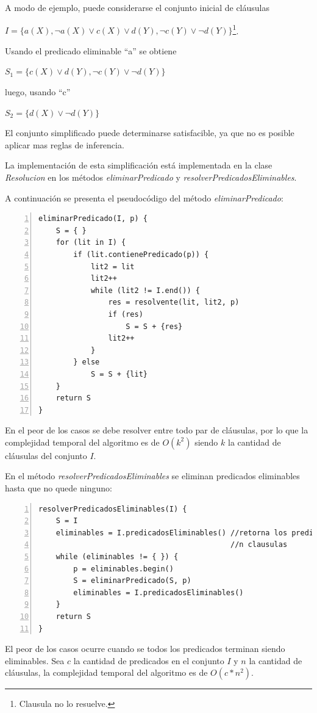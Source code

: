 \documentclass[a4paper,12pt]{article}
\begin{document}
A modo de ejemplo, puede considerarse el conjunto inicial de cláusulas 

\begin{center} 
$I = \{a(X),\lnot a(X) \lor c(X) \lor d(Y), \lnot c(Y) \lor \lnot d(Y)\}$\footnote{Clausula no lo resuelve.}.
\end{center}

Usando el predicado eliminable ``a'' se obtiene

\begin{center}
$S_1 = \{c(X) \lor d(Y), \lnot c(Y) \lor \lnot d(Y)\}$
\end{center}
luego, usando ``c''
\begin{center}
$S_2 = \{d(X) \lor \lnot d(Y)\}$
\end{center}
El conjunto simplificado puede determinarse satisfacible, ya que no es posible aplicar mas
reglas de inferencia.

La implementación de esta simplificación está implementada en la clase \emph{Resolucion} en los métodos
\emph{eliminarPredicado} y \emph{resolverPredicadosEliminables}.

A continuación se presenta el pseudocódigo del método \emph{eliminarPredicado}:
\begin{lstlisting}[caption=eliminarPredicado, frame=single, numbers=left, basicstyle=\tiny]
eliminarPredicado(I, p) {
    S = { }
    for (lit in I) {
        if (lit.contienePredicado(p)) {
            lit2 = lit
            lit2++
            while (lit2 != I.end()) {
                res = resolvente(lit, lit2, p)
                if (res)
                    S = S + {res}
                lit2++
            }
        } else
            S = S + {lit}
    }
    return S
}
\end{lstlisting}
En el peor de los casos se debe resolver entre todo par de cláusulas, por lo que la complejidad
temporal del algoritmo es de $O(k^2)$ siendo $k$ la cantidad de cláusulas del conjunto $I$.

En el método \emph{resolverPredicadosEliminables} se eliminan predicados eliminables hasta que no 
quede ninguno:
\begin{lstlisting}[caption=resolverPredicadosEliminables, frame=single, numbers=left, basicstyle=\tiny]
resolverPredicadosEliminables(I) {
    S = I
    eliminables = I.predicadosEliminables() //retorna los predicados eliminables O(n),
                                            //n clausulas
    while (eliminables != { }) {
        p = eliminables.begin()
        S = eliminarPredicado(S, p)
        eliminables = I.predicadosEliminables()
    }
    return S
}
\end{lstlisting}
El peor de los casos ocurre cuando se todos los predicados terminan siendo eliminables. Sea $c$ la cantidad
de predicados en el conjunto $I$ y $n$ la cantidad de cláusulas, la complejidad temporal del algoritmo es de
$O(c*n^2)$.
\end{document}
